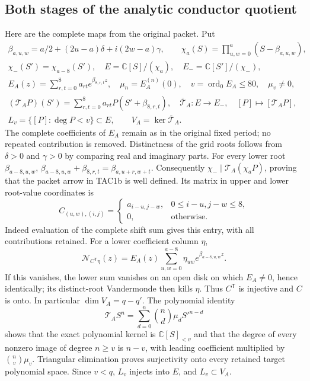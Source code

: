 \documentclass[11pt,a4paper]{article}
\begin{document}
\subsection{Both stages of the analytic conductor quotient}

Here are the complete maps from the original packet. Put
\[
\begin{gathered}
 \beta_{a,u,w}=a/2+(2u-a)\delta+i(2w-a)\gamma,\qquad
 \chi_a(S)=\prod_{u,w=0}^{a}(S-\beta_{a,u,w}),\\
 \chi_-(S')=\chi_{a-8}(S'),\quad
 E=\mathbb C[S]/(\chi_a),\quad E_-=\mathbb C[S']/(\chi_-),\\
 E_A(z)=\sum_{r,t=0}^8 a_{rt}e^{\beta_{8,r,t}z},\quad
 \mu_n=E_A^{(n)}(0),\quad v=\operatorname{ord}_0E_A\le80,
 \quad \mu_v\ne0,\\
 (\mathcal T_AP)(S')=\sum_{r,t=0}^8a_{rt}P(S'+\beta_{8,r,t}),\quad
 \overline{\mathcal T}_A:E\longrightarrow E_-,\quad
 [P]\longmapsto[\mathcal T_AP],\\
 L_v=\{[P]:\deg P<v\}\subset E,\qquad
 V_A=\ker\overline{\mathcal T}_A.
\end{gathered}\tag{TAC1b}
\]
The complete coefficients of $E_A$ remain as in the original fixed
period; no repeated contribution is removed. Distinctness of the grid
roots follows from $\delta>0$ and $\gamma>0$ by comparing real and
imaginary parts. For every lower root $\beta_{a-8,u,w}$,
$\beta_{a-8,u,w}+\beta_{8,r,t}=\beta_{a,u+r,w+t}$.
Consequently $\chi_-\mid\mathcal T_A(\chi_a P)$, proving that the
packet arrow in TAC1b is well defined. Its matrix in upper and lower
root-value coordinates is
\[
 C_{(u,w),(i,j)}=
 \begin{cases}a_{i-u,j-w},&0\le i-u,j-w\le8,\\0,&\text{otherwise}.
 \end{cases}\tag{TAC1c}
\]
Indeed evaluation of the complete shift sum gives this entry, with all
contributions retained. For a lower coefficient column $\eta$,
\[
 \mathcal N_{C^{\mathsf T}\eta}(z)
     =E_A(z)\sum_{u,w=0}^{a-8}\eta_{uw}e^{\beta_{a-8,u,w}z}.
\]
If this vanishes, the lower sum vanishes on an open disk on which
$E_A\ne0$, hence identically; its distinct-root Vandermonde then
kills $\eta$. Thus $C^{\mathsf T}$ is injective and $C$ is onto.
In particular $\dim V_A=q-q'$. The polynomial identity
\[
 \mathcal T_AS^n=\sum_{d=0}^n\binom nd\mu_dS'^{n-d}
\]
shows that the exact polynomial kernel is $\mathbb C[S]_{<v}$ and
that the degree of every nonzero image of degree $n\ge v$ is $n-v$,
with leading coefficient multiplied by $\binom nv\mu_v$.
Triangular elimination proves surjectivity onto every retained target
polynomial space. Since $v<q$, $L_v$ injects into $E$, and $L_v\subset V_A$.
\end{document}
